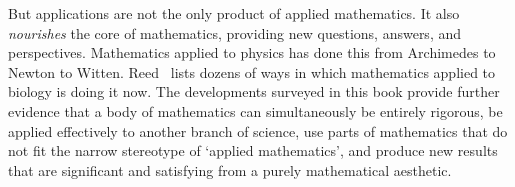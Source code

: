 But applications are not the only product of applied mathematics.  It also
\emph{nourishes} the core of mathematics, providing new questions, answers,
and perspectives.  Mathematics applied to physics has done this from
Archimedes to Newton to Witten.  Reed~\cite{Reed} lists dozens of ways in
which mathematics applied to biology is doing it now.  The developments
surveyed in this book provide further evidence that a body of mathematics
can simultaneously be entirely rigorous, be applied effectively to another
branch of science, use parts of mathematics that do not fit the narrow
stereotype of `applied mathematics', and produce new results that are
significant and satisfying from a purely mathematical aesthetic.




